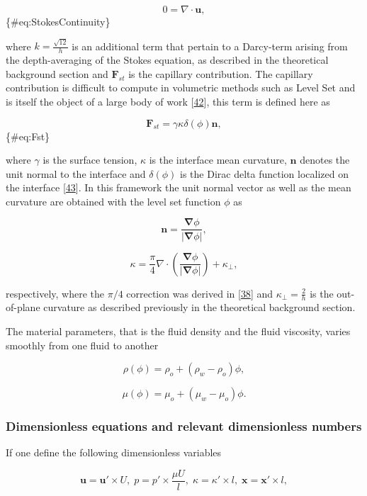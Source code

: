 \documentclass[]{article}
\begin{document}
\[
0=\nabla\cdot\mathbf{u},
\] \{\#eq:StokesContinuity\}

where \(k=\frac{\sqrt{12}}{h}\) is an additional term that pertain to a
Darcy-term arising from the depth-averaging of the Stokes equation, as
described in the theoretical background section and \(\mathbf{F}_{st}\)
is the capillary contribution. The capillary contribution is difficult
to compute in volumetric methods such as Level Set and is itself the
object of a large body of work
{[}\protect\hyperlink{ref-Popinet2018}{42}{]}, this term is defined here
as

\[
\mathbf{F}_{st}=\gamma\kappa\delta(\phi)\mathbf{n},
\] \{\#eq:Fst\}

where \(\gamma\) is the surface tension, \(\kappa\) is the interface
mean curvature, \(\mathbf{n}\) denotes the unit normal to the interface
and \(\delta(\phi)\) is the Dirac delta function localized on the
interface {[}\protect\hyperlink{ref-Galusinski2008}{43}{]}. In this
framework the unit normal vector as well as the mean curvature are
obtained with the level set function \(\phi\) as

\[
\mathbf{n}=\frac{\boldsymbol{\nabla}\phi}{\vert\boldsymbol{\nabla}\phi\vert},
\]

\[
\kappa=\frac{\pi}{4}\nabla\cdot\left(\frac{\boldsymbol{\nabla}\phi}{\vert\boldsymbol{\nabla}\phi\vert}\right)+\kappa_{\perp},
\]

respectively, where the \(\pi/4\) correction was derived in
{[}\protect\hyperlink{ref-park1984two}{38}{]} and
\(\kappa_{\perp}=\frac{2}{h}\) is the out-of-plane curvature as
described previously in the theoretical background section.

The material parameters, that is the fluid density and the fluid
viscosity, varies smoothly from one fluid to another

\[
\rho(\phi)=\rho_{o}+(\rho_{w}-\rho_{o})\phi,
\]

\[
\mu(\phi)=\mu_{o}+(\mu_{w}-\mu_{o})\phi.
\]

\hypertarget{dimensionless-equations-and-relevant-dimensionless-numbers}{%
\subsubsection{Dimensionless equations and relevant dimensionless
numbers}\label{dimensionless-equations-and-relevant-dimensionless-numbers}}

If one define the following dimensionless variables

\[
\mathbf{u}=\mathbf{u}'\times U,\;p=p'\times\frac{\mu U}{l},\;\kappa=\kappa'\times l,\;\mathbf{x}=\mathbf{x}'\times l,
\]
\end{document}
